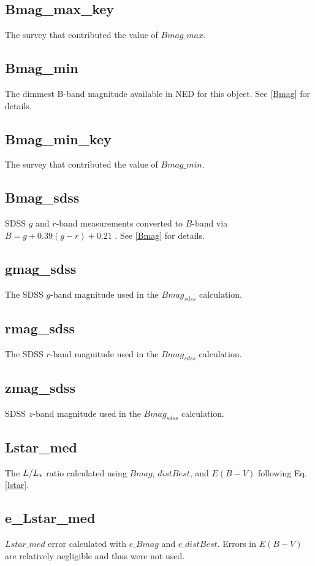 \documentclass[iop]{emulateapj-rtx4}
\begin{document}
\subsection{Bmag\_max\_key}
The survey that contributed the value of $Bmag\_max$.

\subsection{Bmag\_min}
The dimmest B-band magnitude available in NED for this object. See \ref{Bmag} for details.

\subsection{Bmag\_min\_key}
The survey that contributed the value of $Bmag\_min$.

\subsection{Bmag\_sdss}
SDSS $g$ and $r$-band measurements converted to $B$-band via $B = g + 0.39 (g-r) + 0.21$ \citep{jester2005}. See \ref{Bmag} for details.

\subsection{gmag\_sdss}
The SDSS $g$-band magnitude used in the $Bmag_{sdss}$ calculation.

\subsection{rmag\_sdss}
The SDSS $r$-band magnitude used in the $Bmag_{sdss}$ calculation. 

\subsection{zmag\_sdss}
SDSS $z$-band magnitude used in the $Bmag_{sdss}$ calculation.

\subsection{Lstar\_med}
The $L / L_{\**}$ ratio calculated using $Bmag$, $distBest$, and $E(B-V)$ following Eq. \ref{lstar}.

\subsection{e\_Lstar\_med}
$Lstar\_med$ error calculated with $e\_Bmag$ and $e\_distBest$. Errors in $E(B-V)$ are relatively negligible and thus were not used.
\end{document}
